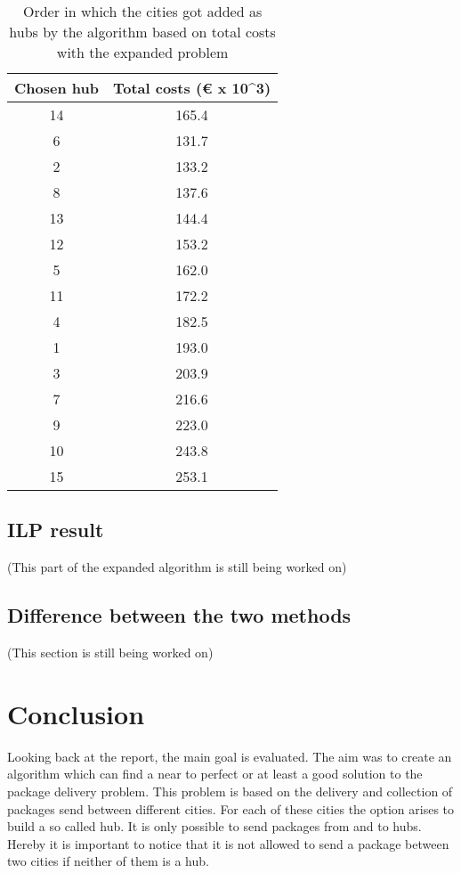 \documentclass{article}
\begin{document}
\begin{table}[h]
    \centering
    \begin{tabular}{||c|c||}
    \hline
        Chosen hub & Total costs (€ x 10^3) \\
    \hline
    \hline
        14 & 165.4 \\
        \hline
        6 & 131.7 \\
        \hline
        2 & 133.2 \\
        \hline
        8 & 137.6 \\
        \hline
        13 & 144.4 \\
        \hline
        12 & 153.2 \\
        \hline
        5 & 162.0 \\
        \hline
        11 & 172.2 \\
        \hline
        4 & 182.5 \\
        \hline
        1 & 193.0 \\
        \hline
        3 & 203.9 \\
        \hline
        7 & 216.6 \\
        \hline
        9 & 223.0 \\
        \hline
        10 & 243.8 \\
        \hline
        15 & 253.1 \\
        \hline
    \end{tabular}
    \caption{\centering Order in which the cities got added as hubs by the algorithm based on total costs with the expanded problem}
    \label{tab:DistAlgExp2}
\end{table}

\subsection{ILP result}
(This part of the expanded algorithm is still being worked on)

\subsection{Difference between the two methods}
(This section is still being worked on)

\newpage
\section{Conclusion}

Looking back at the report, the main goal is evaluated. The aim was to create an algorithm which can find a near to perfect or at least a good solution to the package delivery problem. This problem is based on the delivery and collection of packages send between different cities. For each of these cities the option arises to build a so called hub. It is only possible to send packages from and to hubs. Hereby it is important to notice that it is not allowed to send a package between two cities if neither of them is a hub. 
\end{document}
